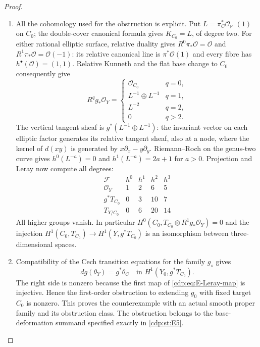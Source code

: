 \begin{proof}
\begin{enumerate}[label={$\langle1\rangle$\arabic*.},leftmargin=*]
\item All the cohomology used for the obstruction is explicit. Put
$L=\pi_C^*\mathcal O_{\mathbb P^1}(1)$ on $C_0$; the
double-cover canonical formula gives $K_{C_0}=L$, of degree two.
For either rational elliptic surface, relative duality gives
$R^0\pi_*\mathcal O=\mathcal O$ and
$R^1\pi_*\mathcal O=\mathcal O(-1)$: its relative canonical
line is $\pi^*\mathcal O(1)$ and every fibre has
$h^\bullet(\mathcal O)=(1,1)$. Relative Kunneth and the flat
base change to $C_0$ consequently give
\[
 R^qg_*\mathcal O_Y=
 \begin{cases}
  \mathcal O_{C_0}&q=0,\\
  L^{-1}\oplus L^{-1}&q=1,\\
  L^{-2}&q=2,\\
  0&q>2.
 \end{cases}
\]
The vertical tangent sheaf is $g^*(L^{-1}\oplus L^{-1})$:
the invariant vector on each elliptic factor generates its
relative tangent sheaf, also at a node, where the kernel of
$d(xy)$ is generated by $x\partial_x-y\partial_y$.
Riemann--Roch on the genus-two curve gives
$h^0(L^{-a})=0$ and $h^1(L^{-a})=2a+1$ for $a>0$.
Projection and Leray now compute all degrees:
\[
\begin{array}{c|rrrr}
 \mathcal F&h^0&h^1&h^2&h^3\\\hline
 \mathcal O_Y&1&2&6&5\\
 g^*T_{C_0}&0&3&10&7\\
 T_{Y/C_0}&0&6&20&14
\end{array}
\]
All higher groups vanish. In particular
$H^0(C_0,T_{C_0}\otimes R^1g_*\mathcal O_Y)=0$ and the
injection $H^1(C_0,T_{C_0})\to H^1(Y,g^*T_{C_0})$ is an
isomorphism between three-dimensional spaces.

\item Compatibility of the Cech transition equations for the family
$g_s$ gives
\[
 dg(\theta_Y)=g^*\theta_C
       \quad\text{in }H^1(Y_0,g^*T_{C_0}).
\]
The right side is nonzero because the first map of
\eqref{cdp:eq:E-Leray-map} is injective. Hence the first-order
obstruction to extending $g_0$ with fixed target $C_0$ is nonzero.
This proves the counterexample with an actual smooth proper
family and its obstruction class. The obstruction belongs to
the base-deformation summand specified exactly in \ref{cdp:st:E5}.

\end{enumerate}
\end{proof}